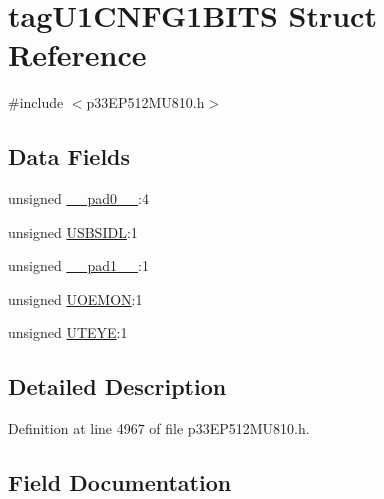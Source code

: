 \hypertarget{structtag_u1_c_n_f_g1_b_i_t_s}{}\section{tag\+U1\+C\+N\+F\+G1\+B\+I\+TS Struct Reference}
\label{structtag_u1_c_n_f_g1_b_i_t_s}


{\ttfamily \#include $<$p33\+E\+P512\+M\+U810.\+h$>$}

\subsection*{Data Fields}
\begin{DoxyCompactItemize}
\item 
unsigned \hyperlink{structtag_u1_c_n_f_g1_b_i_t_s_adf71f3d8410c1f1dbbc96680a92c49af}{\+\_\+\+\_\+pad0\+\_\+\+\_\+}\+:4
\item 
unsigned \hyperlink{structtag_u1_c_n_f_g1_b_i_t_s_aaa8c221f3307098b80c41238ec9981c4}{U\+S\+B\+S\+I\+DL}\+:1
\item 
unsigned \hyperlink{structtag_u1_c_n_f_g1_b_i_t_s_acaf2d0924a107ec6e8d2e31febaf66f9}{\+\_\+\+\_\+pad1\+\_\+\+\_\+}\+:1
\item 
unsigned \hyperlink{structtag_u1_c_n_f_g1_b_i_t_s_a134f57b5d1cad28e1fde20695d26ded1}{U\+O\+E\+M\+ON}\+:1
\item 
unsigned \hyperlink{structtag_u1_c_n_f_g1_b_i_t_s_a59d6746634afd4413989dfc9c9dee289}{U\+T\+E\+YE}\+:1
\end{DoxyCompactItemize}


\subsection{Detailed Description}


Definition at line 4967 of file p33\+E\+P512\+M\+U810.\+h.



\subsection{Field Documentation}
\mbox{\label{structtag_u1_c_n_f_g1_b_i_t_s_adf71f3d8410c1f1dbbc96680a92c49af}} 
